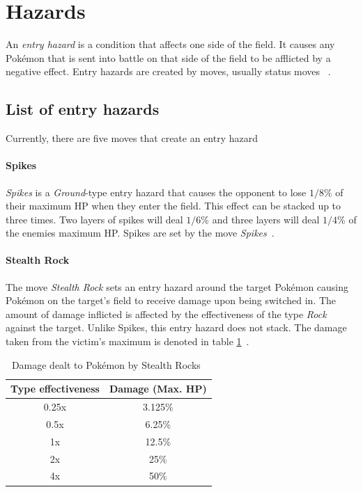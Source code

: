 \section{Hazards}
\label{sec:hazards}
An \textit{entry hazard} is a condition that affects one side of the field. It causes
any Pokémon that is sent into battle on that side of the field to be afflicted by 
a negative effect. Entry hazards are created by moves, usually status moves
~\autocite{Bulbapedia:EntryHazards}. \\
\subsection{List of entry hazards}
Currently, there are five moves that create an entry hazard

\paragraph{Spikes}
\textit{Spikes} is a \textit{Ground}-type entry hazard that causes the opponent
to lose $1/8$\% of their maximum \ac{HP} when they enter the field. This
effect can be stacked up to three times. Two layers of spikes will deal
$1/6$\% and three layers will deal $1/4$\% of the enemies maximum \ac{HP}.
Spikes are set by the move \textit{Spikes}~\autocite{Bulbapedia:Spikes}.

\paragraph{Stealth Rock}
\label{sec:stealthrock}
The move \textit{Stealth Rock} sets an entry hazard around the target Pokémon
causing Pokémon on the target's field to receive damage upon being switched in.
The amount of damage inflicted is affected by the effectiveness of the type
\textit{Rock} against the target. Unlike Spikes, this entry hazard does not stack.
The damage taken from the victim's maximum is denoted in table 
\ref{tab:stealth-rock-damage}~\autocite{Bulbapedia:StealthRock}.
\begin{table}[h]
	\centering
	\begin{tabular}{|c|c|}
		\hline
		\textbf{Type effectiveness} & \textbf{Damage (Max. \ac{HP}}) \\
		\hline 
		0.25x & 3.125\% \\ 
		\hline 
		0.5x &  6.25\% \\ 
		\hline 
		1x & 12.5\% \\
		\hline
		2x & 25\% \\
		\hline
		4x & 50\% \\
		\hline
	\end{tabular} 
	\caption{Damage dealt to Pokémon by Stealth Rocks~\autocite{Bulbapedia:StealthRock}}
	\label{tab:stealth-rock-damage}
\end{table}


